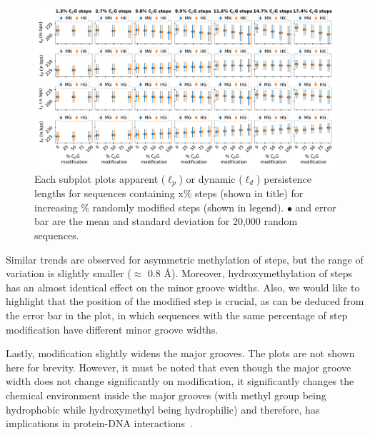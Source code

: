 
\begin{figure}[H]
\begin{center}
\centering\includegraphics[width=15.5cm,trim=1.5cm 0.95cm 0cm 0.6cm]{images/persis_length_epi.pdf}
\end{center}
\caption{
Each subplot plots apparent ($\ell_{p}$) or dynamic ($\ell_{d}$) persistence lengths for sequences containing x\% \cpg steps (shown in title) for increasing \% randomly modified \cpg steps (shown in legend).
$\bullet$ and error bar are the mean and standard deviation for 20,000 random sequences.
}
\label{c6:fig7_persis}
\end{figure}
\noindent Similar trends are observed for asymmetric methylation of \cpg steps, but the range of variation is slightly smaller ($\approx$ 0.8 \AA).
Moreover, hydroxymethylation of \cpg steps has an almost identical effect on the minor groove widths. 
Also, we would like to highlight that the position of the modified \cpg step is crucial, as can be deduced from the error bar in the plot, in which sequences with the same percentage of \cpg step modification have different minor groove widths.

Lastly, \cpg modification slightly widens the major grooves. 
The plots are not shown here for brevity.
However, it must be noted that even though the major groove width does not change significantly on \cpg modification, it significantly changes the chemical environment inside the major grooves (with methyl group being hydrophobic while hydroxymethyl being hydrophilic) and therefore, has implications in protein-DNA interactions~\cite{rao2018systematic}. 

